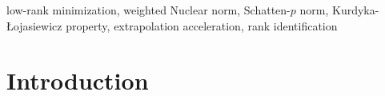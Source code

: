 \documentclass[twoside,11pt]{article}
\numberwithin{equation}{section}
\begin{document}
\begin{abstract}
 
\end{abstract}

\begin{keywords}
  low-rank minimization, weighted Nuclear norm,  Schatten-$p$ norm, Kurdyka-{\L}ojasiewicz property, extrapolation acceleration, rank identification 
\end{keywords}

\section{Introduction}
\end{document}
